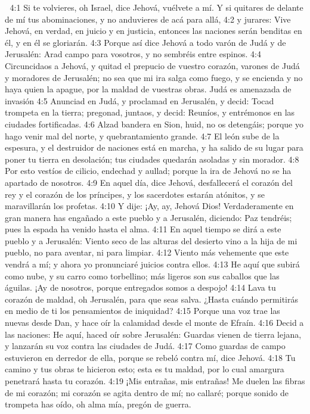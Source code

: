 
4:1 Si te volvieres, oh Israel, dice Jehová, vuélvete a mí. Y si quitares de delante de mí tus abominaciones, y no anduvieres de acá para allá,  
4:2 y jurares: Vive Jehová, en verdad, en juicio y en justicia, entonces las naciones serán benditas en él, y en él se gloriarán.  
4:3 Porque así dice Jehová a todo varón de Judá y de Jerusalén: Arad campo para vosotros, y no sembréis entre espinos. 
4:4 Circuncidaos a Jehová, y quitad el prepucio de vuestro corazón, varones de Judá y moradores de Jerusalén; no sea que mi ira salga como fuego, y se encienda y no haya quien la apague, por la maldad de vuestras obras.  
Judá es amenazada de invasión  
4:5 Anunciad en Judá, y proclamad en Jerusalén, y decid: Tocad trompeta en la tierra; pregonad, juntaos, y decid: Reuníos, y entrémonos en las ciudades fortificadas.  
4:6 Alzad bandera en Sion, huid, no os detengáis; porque yo hago venir mal del norte, y quebrantamiento grande.  
4:7 El león sube de la espesura, y el destruidor de naciones está en marcha, y ha salido de su lugar para poner tu tierra en desolación; tus ciudades quedarán asoladas y sin morador.  
4:8 Por esto vestíos de cilicio, endechad y aullad; porque la ira de Jehová no se ha apartado de nosotros.  
4:9 En aquel día, dice Jehová, desfallecerá el corazón del rey y el corazón de los príncipes, y los sacerdotes estarán atónitos, y se maravillarán los profetas.  
4:10 Y dije: ¡Ay, ay, Jehová Dios! Verdaderamente en gran manera has engañado a este pueblo y a Jerusalén, diciendo: Paz tendréis; pues la espada ha venido hasta el alma.  
4:11 En aquel tiempo se dirá a este pueblo y a Jerusalén: Viento seco de las alturas del desierto vino a la hija de mi pueblo, no para aventar, ni para limpiar.  
4:12 Viento más vehemente que este vendrá a mí; y ahora yo pronunciaré juicios contra ellos.  
4:13 He aquí que subirá como nube, y su carro como torbellino; más ligeros son sus caballos que las águilas. ¡Ay de nosotros, porque entregados somos a despojo!  
4:14 Lava tu corazón de maldad, oh Jerusalén, para que seas salva. ¿Hasta cuándo permitirás en medio de ti los pensamientos de iniquidad?  
4:15 Porque una voz trae las nuevas desde Dan, y hace oír la calamidad desde el monte de Efraín.  
4:16 Decid a las naciones: He aquí, haced oír sobre Jerusalén: Guardas vienen de tierra lejana, y lanzarán su voz contra las ciudades de Judá.  
4:17 Como guardas de campo estuvieron en derredor de ella, porque se rebeló contra mí, dice Jehová.  
4:18 Tu camino y tus obras te hicieron esto; esta es tu maldad, por lo cual amargura penetrará hasta tu corazón.  
4:19 ¡Mis entrañas, mis entrañas! Me duelen las fibras de mi corazón; mi corazón se agita dentro de mí; no callaré; porque sonido de trompeta has oído, oh alma mía, pregón de guerra.  
